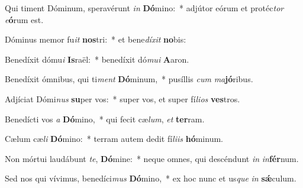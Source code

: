 \item Qui timent Dóminum, speravérunt \textit{in} \textbf{Dó}mino:~* adjútor eórum et protéc\textit{tor} \textit{e}\textbf{ó}rum est.
\item Dóminus memor fu\textit{it} \textbf{nos}tri:~* et bene\textit{dí}\textit{xit} \textbf{no}bis:
\item Benedíxit dómu\textit{i} \textbf{Is}raël:~* benedíxit dó\textit{mu}\textit{i} \textbf{A}aron.
\item Benedíxit ómnibus, qui ti\textit{ment} \textbf{Dó}minum,~* pusíllis \textit{cum} \textit{ma}\textbf{jó}ribus.
\item Adjíciat Dómi\textit{nus} \textbf{su}per vos:~* super vos, et super fí\textit{li}\textit{os} \textbf{ves}tros.
\item Benedícti vos \textit{a} \textbf{Dó}mino,~* qui fecit cæ\textit{lum}, \textit{et} \textbf{ter}ram.
\item Cælum cæ\textit{li} \textbf{Dó}mino:~* terram autem dedit fí\textit{li}\textit{is} \textbf{hó}minum.
\item Non mórtui laudábunt \textit{te}, \textbf{Dó}mine:~* neque omnes, qui descéndunt \textit{in} \textit{in}\textbf{fér}num.
\item Sed nos qui vívimus, benedíci\textit{mus} \textbf{Dó}mino,~* ex hoc nunc et us\textit{que} \textit{in} \textbf{sǽ}culum.
